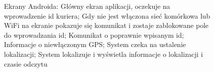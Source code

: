 \documentclass[eng,printmode,oneside]{mgr}
\begin{document}
\begin{figure}
\caption{Ekrany Androida:  Główny ekran
aplikacji, oczekuje na wprowadzenie id
kuriera;  Gdy nie jest włączona sieć komórkowa lub WiFi na
ekranie pokazuje się komunikat i zostaje zablokowane pole do wprowadzania
id;  Komunikat o poprawnie wpisanym id;  Informacje
o niewłączonym GPS;  System czeka na ustalenie lokalizacji;
 System lokalizuje i wyświetla informacje o lokalizacji i czasie
odczytu}
\label{fig:androidViewOK}
\end{figure}
\end{document}

